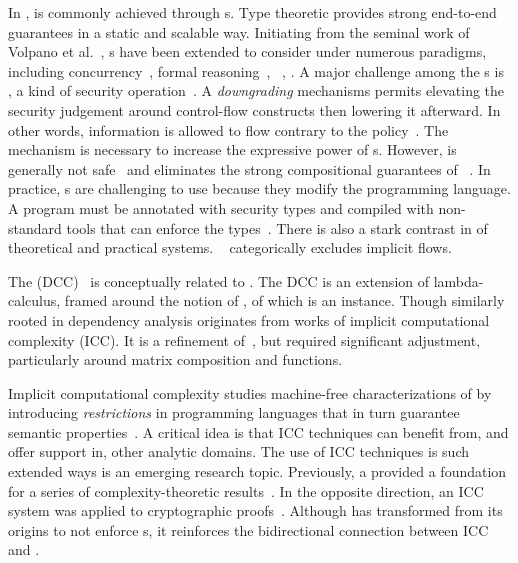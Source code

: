 In ,  is commonly achieved
through s. Type theoretic 
provides strong end-to-end  guarantees in a static and
scalable way. Initiating from the seminal work of Volpano et
al.~\cite{volpano1996}, s have been extended to
consider  under numerous paradigms, including
concurrency~\cite{volpano1998,derakhshan2024,frumin2021}, formal reasoning~\cite{nelson2020,frumin2021}, ~\cite{barthe2004}, \etc. A major challenge among the s is \emph{}, a kind of security
 operation~\cite{cecchetti2017}. A \emph{downgrading}
mechanisms permits elevating the security judgement around control-flow
constructs then lowering it afterward. In other words, information is allowed to
flow contrary to the policy~\cite{cecchetti2017}. The mechanism is necessary to
increase the expressive power of s. However,  is generally not safe~\cite{derakhshan2024}
and eliminates the strong compositional guarantees of
~\cite{cecchetti2017}. In practice, s are challenging to use because they modify the programming language. A
program must be annotated with security types and compiled with non-standard
tools that can enforce the types~\cite{lamba2024}. There is also a stark
contrast in  of theoretical and practical systems.
\Eg~\cite{huang2014} categorically excludes implicit flows.

The  (DCC)~\cite{abadi1999b} is conceptually
related to \lname. The DCC is an extension of
lambda-calculus, framed around the notion of
, of which  is an instance. Though
similarly rooted in dependency analysis \lname
originates from works of implicit computational complexity (ICC). It is a
refinement of~\cite{moyen20172,aubert20232}, but \lname required significant
adjustment, particularly around matrix composition and functions.

Implicit computational complexity studies machine-free characterizations of
 by introducing \emph{restrictions} in programming
languages that in turn guarantee semantic properties~\cite{dallago2011}. A
critical idea is that ICC techniques can benefit from, and offer support in,
other analytic domains. The use of ICC techniques is such extended ways is an
emerging research topic. Previously, a   provided a foundation for a series of
complexity-theoretic results~\cite{marion2011,hainry2023}. In the opposite
direction, an ICC system was applied to cryptographic
proofs~\cite{baillot2019}. Although \lname has transformed from its origins to
not enforce s, it reinforces the bidirectional connection
between ICC and .

